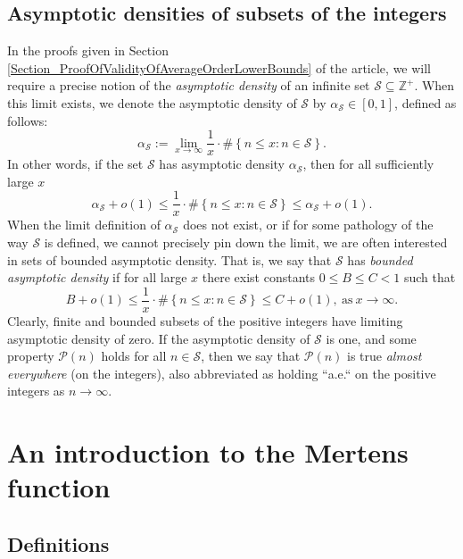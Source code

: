 \documentclass[11pt,reqno,a4letter]{article}
\numberwithin{figure}{section}
\numberwithin{table}{section}
\theoremstyle{plain}
\numberwithin{theorem}{section}
\theoremstyle{definition}
\begin{document}
\subsection{Asymptotic densities of subsets of the integers} 

In the proofs given in Section \ref{Section_ProofOfValidityOfAverageOrderLowerBounds} 
of the article, we will require a precise notion of the 
\emph{asymptotic density} of an infinite set $\mathcal{S} \subseteq \mathbb{Z}^{+}$. 
When this limit exists, we denote the asymptotic density of 
$\mathcal{S}$ by $\alpha_{\mathcal{S}} \in [0, 1]$, defined as follows: 
\[
\alpha_{\mathcal{S}} := \lim_{x \rightarrow \infty} \frac{1}{x} \cdot \#\left\{ 
     n \leq x: n \in \mathcal{S} 
     \right\}. 
\]
In other words, if the set $\mathcal{S}$ has asymptotic density $\alpha_{\mathcal{S}}$, then 
for all sufficiently large $x$ 
\[
\alpha_{\mathcal{S}} + o(1) \leq \frac{1}{x} \cdot \#\left\{ 
     n \leq x: n \in \mathcal{S} \right\} \leq 
     \alpha_{\mathcal{S}} + o(1). 
\]
When the limit definition of $\alpha_{\mathcal{S}}$ does not exist, or if for some 
pathology of the way $\mathcal{S}$ is defined, we cannot precisely pin down the limit, we are often 
interested in sets of bounded asymptotic density. That is, we say that $\mathcal{S}$ has 
\emph{bounded asymptotic density} if for all large $x$ there exist constants $0 \leq B \leq C < 1$ 
such that 
\[
B + o(1) \leq \frac{1}{x} \cdot \#\left\{ 
     n \leq x: n \in \mathcal{S} \right\} \leq C + o(1), \mathrm{\ as\ } x \rightarrow \infty. 
\]
Clearly, finite and bounded subsets of the positive integers have limiting asymptotic density of zero. 
If the asymptotic density of $\mathcal{S}$ is one, and some property $\mathcal{P}(n)$ holds 
for all $n \in \mathcal{S}$, then we say that $\mathcal{P}(n)$ is true 
\emph{almost everywhere} (on the integers), also abbreviated as holding ``a.e.`` on the positive integers 
as $n \rightarrow \infty$. 

\newpage
\section{An introduction to the Mertens function} 
\label{subSection_MertensMxClassical_Intro} 

\subsection{Definitions} 
\end{document}
